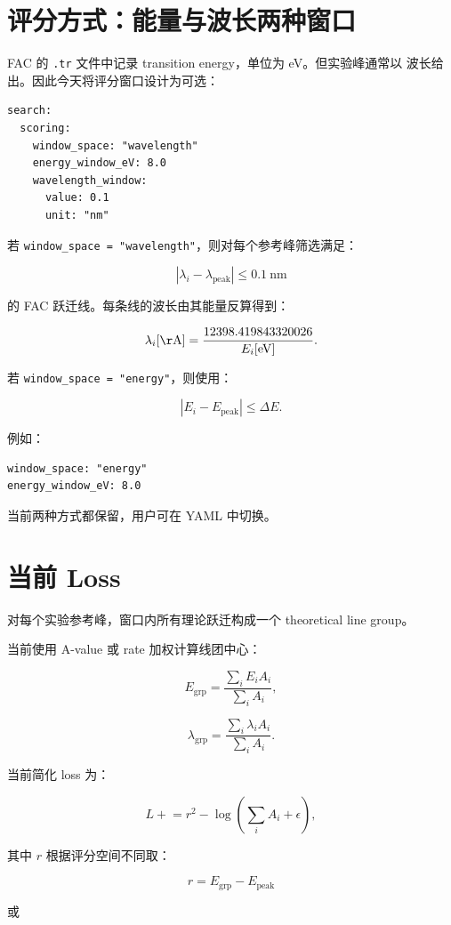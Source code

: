 \documentclass[11pt,a4paper]{article}
\begin{document}
\section{评分方式：能量与波长两种窗口}

FAC 的 \texttt{.tr} 文件中记录 transition energy，单位为 eV。但实验峰通常以
波长给出。因此今天将评分窗口设计为可选：

\begin{lstlisting}
search:
  scoring:
    window_space: "wavelength"
    energy_window_eV: 8.0
    wavelength_window:
      value: 0.1
      unit: "nm"
\end{lstlisting}

若 \texttt{window\_space = "wavelength"}，则对每个参考峰筛选满足：

\[
|\lambda_i - \lambda_{\mathrm{peak}}| \le 0.1~\mathrm{nm}
\]

的 FAC 跃迁线。每条线的波长由其能量反算得到：

\[
\lambda_i[\mathrm{\AA}] =
\frac{12398.419843320026}{E_i[\mathrm{eV}]}.
\]

若 \texttt{window\_space = "energy"}，则使用：

\[
|E_i - E_{\mathrm{peak}}| \le \Delta E.
\]

例如：

\begin{lstlisting}
window_space: "energy"
energy_window_eV: 8.0
\end{lstlisting}

当前两种方式都保留，用户可在 YAML 中切换。

\section{当前 Loss}

对每个实验参考峰，窗口内所有理论跃迁构成一个 theoretical line group。

当前使用 A-value 或 rate 加权计算线团中心：

\[
E_{\mathrm{grp}} =
\frac{\sum_i E_i A_i}{\sum_i A_i},
\]

\[
\lambda_{\mathrm{grp}} =
\frac{\sum_i \lambda_i A_i}{\sum_i A_i}.
\]

当前简化 loss 为：

\[
L \mathrel{+}= r^2 - \log\left(\sum_i A_i + \epsilon\right),
\]

其中 $r$ 根据评分空间不同取：

\[
r = E_{\mathrm{grp}} - E_{\mathrm{peak}}
\]

或
\end{document}
